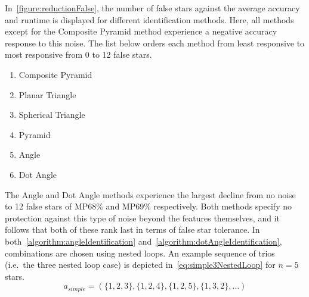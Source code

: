 \begin{figure}
\end{figure}

In~\autoref{figure:reductionFalse}, the number of false stars against the average accuracy and runtime is displayed
for different identification methods.
Here, all methods except for the Composite Pyramid method experience a negative accuracy response to this noise.
The list below orders each method from least responsive to most responsive from 0 to 12 false stars.
\begin{multicols}{2}
    \begin{enumerate}
        \item Composite Pyramid
        \item Planar Triangle
        \item Spherical Triangle
        \item Pyramid
        \item Angle
        \item Dot Angle
    \end{enumerate}
\end{multicols}

The Angle and Dot Angle methods experience the largest decline from no noise to 12 false stars of MP68\% and MP69\%
respectively.
Both methods specify no protection against this type of noise beyond the features themselves, and it follows that
both of these rank last in terms of false star tolerance.
In both~\autoref{algorithm:angleIdentification} and~\autoref{algorithm:dotAngleIdentification}, combinations are chosen
using nested loops.
An example sequence of trios (i.e.\ the three nested loop case) is depicted in~\autoref{eq:simple3NestedLoop} for
$n = 5$ stars.
\begin{equation}\label{eq:simple3NestedLoop}
a_{simple} = ( \{1,2,3\}, \{1,2,4\}, \{1,2,5\}, \{1,3,2\}, \ldots )
\end{equation}

